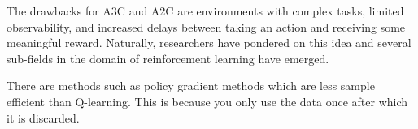 \documentclass[conference]{IEEEtran}
\begin{document}

The drawbacks for A3C and A2C are environments with complex tasks, limited observability, and increased delays between taking an action and receiving some meaningful reward. Naturally, researchers have pondered on this idea and several sub-fields in the domain of reinforcement learning have emerged.



There are methods such as policy gradient methods which are less sample efficient than Q-learning. This is because you only use the data once after which it is discarded.
\end{document}
